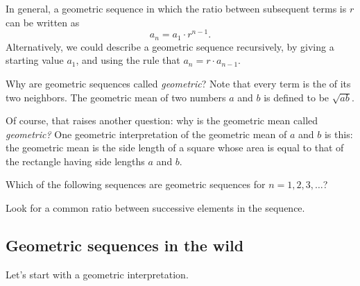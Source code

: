 \documentclass{ximera}
\begin{document}
In general, a geometric sequence in which the ratio between
subsequent terms is $r$ can be written as
\[
a_n = a_1 \cdot r^{n-1}.
\]
Alternatively, we could describe a geometric sequence
recursively, by giving a starting value $a_1$, and using the rule that
$a_{n} = r \cdot a_{n-1}$.

\begin{remark}
Why are geometric sequences called \textit{geometric}?  Note that
every term is the  of its two neighbors.  The
geometric mean of two numbers $a$ and $b$ is defined to be
$\sqrt{ab}$.

Of course, that raises another question: why is the geometric mean
called \textit{geometric?}  One geometric interpretation of the
geometric mean of $a$ and $b$ is this: the geometric mean is the side
length of a square whose area is equal to that of the rectangle having
side lengths $a$ and $b$.
\end{remark}

\begin{question}
  Which of the following sequences are geometric sequences for
  $n=1,2,3,\dots$?
  \begin{selectAll}
  \end{selectAll}
  \begin{hint}
    Look for a common ratio between successive elements in the sequence. 
  \end{hint}
\end{question}

\subsection{Geometric sequences in the wild}

Let's start with a geometric interpretation.
\end{document}
